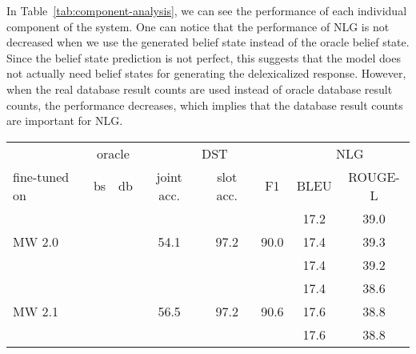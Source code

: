 \documentclass[11pt]{article}
\newcommand{\cmark}{\ding{51}}\newcommand{\xmark}{\ding{55}}
\begin{document}
In Table~\ref{tab:component-analysis}, we can see the performance of each individual component of the system. One can notice that the performance of NLG is not decreased when we use the generated belief state instead of the oracle belief state. Since the belief state prediction is not perfect, this suggests that the model does not actually need belief states for generating the delexicalized response. However, when the real database result counts are used instead of oracle database result counts, the performance decreases, which implies that the database result counts are important for NLG.

\begin{table*}[htbp]
    \centering\small
    \begin{tabular}{l|cc|ccc|cc}
        & \multicolumn{2}{c|}{oracle} & \multicolumn{3}{c|}{DST} & \multicolumn{2}{c}{NLG} \\
        fine-tuned on & bs & db & joint acc. & slot acc. & F1 & BLEU & ROUGE-L \\
        \hline
        \multirow{3}{*}{MW 2.0} & \xmark & \xmark & \multirow{3}{*}{54.1} & \multirow{3}{*}{97.2} & \multirow{3}{*}{90.0} & 17.2 & 39.0 \\
        & \xmark & \cmark &  & & & 17.4 & 39.3 \\
        & \cmark & \cmark &  & & & 17.4 & 39.2 \\
        \hline
        \multirow{3}{*}{MW 2.1} & \xmark & \xmark & \multirow{3}{*}{56.5} & \multirow{3}{*}{97.2} & \multirow{3}{*}{90.6} & 17.4 & 38.6 \\
        & \xmark & \cmark &  & & & 17.6 & 38.8 \\
        & \cmark & \cmark &  & & & 17.6 & 38.8 \\
        \hline
    \end{tabular}
    \caption{Performance of DST and NLG components. Joint and slot accuracies, as well as slot values F1 score, are used to evaluate DST. For NLG, BLEU and ROUGE-L metrics are used. Apart from using the generated belief states and database counts, we also evaluate the components with oracle values. Note that models were pre-trained on Taskmaster-1 and Schema-Guided Dialogue datasets.}
    \label{tab:component-analysis}
\end{table*}
\end{document}
